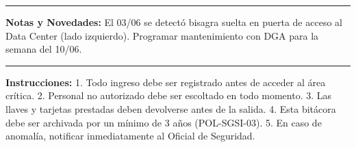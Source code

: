 \documentclass[10pt,letterpaper]{article}
\begin{document}
\begin{center}\rule{0.5\linewidth}{0.5pt}\end{center}

\textbf{Notas y Novedades:} El 03/06 se detectó bisagra suelta en puerta
de acceso al Data Center (lado izquierdo). Programar mantenimiento con
DGA para la semana del 10/06.

\begin{center}\rule{0.5\linewidth}{0.5pt}\end{center}

\textbf{Instrucciones:} 1. Todo ingreso debe ser registrado antes de
acceder al área crítica. 2. Personal no autorizado debe ser escoltado en
todo momento. 3. Las llaves y tarjetas prestadas deben devolverse antes
de la salida. 4. Esta bitácora debe ser archivada por un mínimo de 3
años (POL-SGSI-03). 5. En caso de anomalía, notificar inmediatamente al
Oficial de Seguridad.
\end{document}
